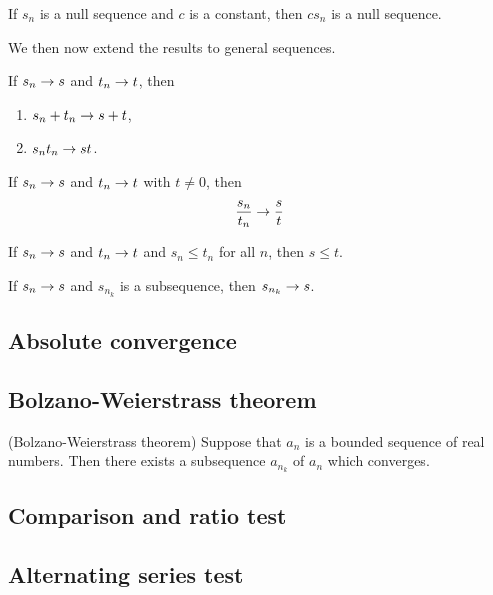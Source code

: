 \documentclass[main.tex]{subfiles}
\begin{document}
	\begin{corollary}
		If $s_n$ is a null sequence and $c$ is a constant, then $cs_n$ is a null sequence.
	\end{corollary}
	We then now extend the results to general sequences.
	\begin{theorem}
		If $s_n \rightarrow s$ and $t_n \rightarrow t$, then
		\begin{enumerate}
			\item $s_n + t_n \rightarrow s + t$,
			\item $s_n t_n \rightarrow st$.
		\end{enumerate}
	\end{theorem}
	
	\begin{theorem}
		If $s_n \rightarrow s$ and $t_n \rightarrow t$ with $t \neq 0$, then
		\begin{equation*}
		\frac{s_n}{t_n} \rightarrow \frac{s}{t}
		\end{equation*}
	\end{theorem}
	
	\begin{theorem}
		If $s_n \rightarrow s$ and $t_n \rightarrow t$ and $s_n \leq t_n$ for all $n$, then $s \leq t$.
	\end{theorem}
	
	\begin{theorem}
		If $s_n \rightarrow s$ and $s_{n_k}$ is a subsequence, then $s_{n_k} \rightarrow s$.
	\end{theorem}
	
	\subsection{Absolute convergence}
	
	\subsection{Bolzano-Weierstrass theorem}
	\begin{theorem}(Bolzano-Weierstrass theorem)
		Suppose that $a_n$ is a bounded sequence of real numbers. Then there exists a subsequence $a_{n_k}$ of $a_n$ which converges.
	\end{theorem}
	\subsection{Comparison and ratio test}
	
	\subsection{Alternating series test}
	
\end{document}
